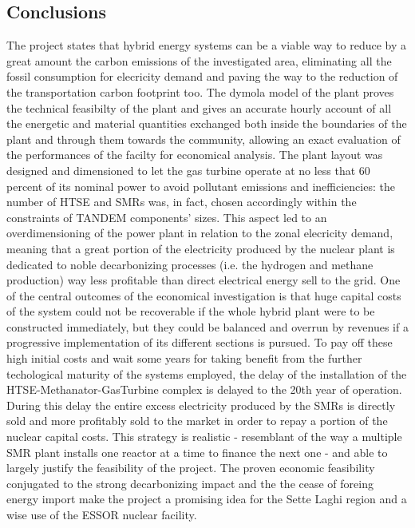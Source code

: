 \subsection{Conclusions}
The project states that hybrid energy systems can be a viable way to reduce by a great amount the carbon emissions of the investigated area, eliminating all the 
fossil consumption for elecricity demand and paving the way to the reduction of the transportation carbon footprint too. The dymola model of the plant proves the technical feasibilty of the plant and gives an accurate hourly account of all the energetic and material quantities exchanged both inside the boundaries of the plant and through them towards the community, allowing an exact evaluation of the performances of the facilty for economical analysis. The plant layout was designed and dimensioned to let the gas turbine operate at no less that 60 percent of its nominal power to avoid pollutant emissions and inefficiencies: the number of HTSE and SMRs was, in fact, chosen accordingly within the constraints of TANDEM \cite{Tandem} components' sizes. This aspect led to an overdimensioning of the power plant in relation to the zonal elecricity demand, meaning that a great portion of the electricity produced by the nuclear plant is dedicated to noble decarbonizing processes (i.e. the hydrogen and methane production) way less profitable than direct electrical energy sell to the grid.  One of the central outcomes of the economical investigation is that huge capital costs of the system could not be recoverable if the whole hybrid plant were to be constructed immediately, but they could be balanced and overrun by revenues if a progressive implementation of its different sections is pursued. To pay off these high initial costs and wait some years for taking benefit from the further techological maturity of the systems employed, the delay of the installation of the HTSE-Methanator-GasTurbine complex is delayed to the 20th year of operation. During this delay the entire excess electricity produced by the SMRs is directly sold and more profitably sold to the market in order to repay a portion of the nuclear capital costs. This strategy is realistic - resemblant of the way a multiple SMR plant installs one reactor at a time to finance the next one - and able to largely justify the feasibility of the project. The proven economic feasibility conjugated to the strong decarbonizing impact and the the cease of foreing energy import make the project a promising idea for the Sette Laghi region and a wise use of the ESSOR nuclear facility.  

